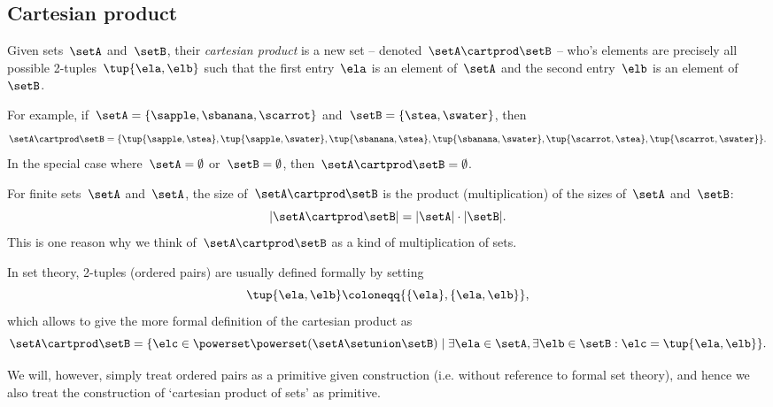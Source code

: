 \subsection{Cartesian product}\label{sec:cartesian-product}

Given sets~$\setA$ and~$\setB$, their \emph{cartesian product} is a new set -- denoted~$\setA \cartprod \setB$ -- who's elements are precisely all possible 2-tuples~$\tup{\ela, \elb}$ such that the first entry~$\ela$ is an element of~$\setA$ and the second entry~$\elb$ is an element of~$\setB$.

For example, if~$\setA = \{ \sapple, \sbanana, \scarrot\}$ and~$\setB = \{ \stea, \swater \}$, then
\begin{equation*}
    \setA \cartprod \setB = \{ \tup{\sapple, \stea}, \tup{\sapple, \swater}, \tup{\sbanana, \stea}, \tup{\sbanana, \swater},  \tup{\scarrot, \stea}, \tup{\scarrot, \swater}\}.
\end{equation*}
In the special case where~$\setA = \emptyset$ or~$\setB = \emptyset$, then~$\setA \cartprod \setB = \emptyset$.

\begin{remark}
    For finite sets~$\setA$ and~$\setA$, the size of~$\setA \cartprod \setB$ is the product (multiplication) of the sizes of~$\setA$ and~$\setB$:
    \begin{equation*}
        \vert \setA \cartprod \setB \vert = \vert \setA \vert \cdot \vert \setB \vert.
    \end{equation*}
    This is one reason why we think of~$\setA \cartprod \setB$ as a kind of multiplication of sets.
\end{remark}

In set theory, 2-tuples (ordered pairs) are usually defined formally by setting
\begin{equation}
    \label{eq:ordered-pair}
    \tup{\ela, \elb} \coloneqq \{ \{\ela \} , \{ \ela, \elb \} \},
\end{equation}
which allows to give the more formal definition of the cartesian product as
\begin{equation}
    \setA \cartprod \setB = \{ \elc \in \powerset \powerset (\setA \setunion \setB) \mid \exists \ela \in \setA, \exists \elb \in \setB : \elc = \tup{\ela, \elb} \}.
\end{equation}

We will, however, simply treat ordered pairs as a primitive given construction (i.e. without reference to formal set theory), and hence we also treat the construction of `cartesian product of sets' as primitive.


